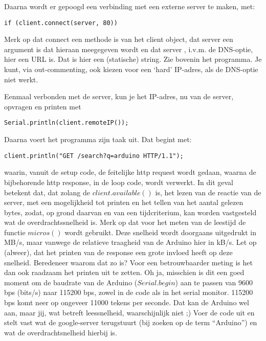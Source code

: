 Daarna wordt er gepoogd een verbinding met een externe server te maken, met:
\begin{lstlisting}[language=Arduino, numbers=none]
if (client.connect(server, 80))
\end{lstlisting}
Merk op dat connect een methode is van het client object, dat server een argument is dat hieraan meegegeven wordt en dat server , i.v.m. de DNS-optie, hier een URL is. Dat is hier een (statische) string. Zie bovenin het programma. Je kunt, via out-commenting, ook kiezen voor een ‘hard’ IP-adres, als de DNS-optie niet werkt. \par
Eenmaal verbonden met de server, kun je het IP-adres, nu van de server, opvragen en printen met 
\begin{lstlisting}[language=Arduino, numbers=none]
Serial.println(client.remoteIP());
\end{lstlisting}

Daarna voert het programma zijn taak uit. Dat begint met:
\begin{lstlisting}[language=Arduino, numbers=none]
client.println("GET /search?q=arduino HTTP/1.1");
\end{lstlisting}

waarin, vanuit de setup code, de feitelijke http request wordt gedaan, waarna de bijbehorende http response, in de loop code, wordt verwerkt. In dit geval betekent dat, dat zolang de $client.available()$ is, het lezen van de reactie van de server, met een mogelijkheid tot printen en het tellen van het aantal gelezen bytes, zodat, op grond daarvan en van een tijdcriterium, kan worden vastgesteld wat de overdrachtssnelheid is. Merk op dat voor het meten van de leestijd de functie $micros()$ wordt gebruikt. Deze snelheid wordt doorgaans uitgedrukt in MB/s, maar vanwege de relatieve traagheid van de Arduino hier in kB/s. Let op (alweer), dat het printen van de response een grote invloed heeft op deze snelheid. Beredeneer waarom dat zo is? Voor een betrouwbaarder meting is het dan ook raadzaam het printen uit te zetten.
Oh ja, misschien is dit een goed moment om de baudrate van de Arduino ($Serial.begin$) aan te passen van 9600 bps (bits/s) naar 115200 bps, zowel in de code als in het serial monitor. 115200 bps komt neer op ongeveer 11000 tekens per seconde. Dat kan de Arduino wel aan, maar jij, wat betreft leessnelheid, waarschijnlijk niet ;)
Voer de code uit en stelt vast wat de google-server terugstuurt (bij zoeken op de term “Arduino”) en wat de overdrachtsnelheid hierbij is. \newline \newline

